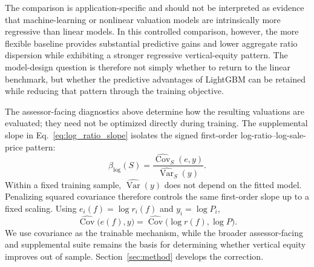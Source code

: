 \documentclass[10pt]{article}
\theoremstyle{definition}
\newcommand{\1}{\mathbf{1}}
\begin{document}

{The comparison is application-specific and should not be interpreted as evidence that machine-learning or nonlinear valuation models are intrinsically more regressive than linear models. In this controlled comparison, however, the more flexible baseline provides substantial predictive gains and lower aggregate ratio dispersion while exhibiting a stronger regressive vertical-equity pattern. The model-design question is therefore not simply whether to return to the linear benchmark, but whether the predictive advantages of LightGBM can be retained while reducing that pattern through the training objective.}


{The assessor-facing diagnostics above determine how the resulting valuations are evaluated; they need not be optimized directly during training. The supplemental slope in Eq.~\eqref{eq:log_ratio_slope} isolates the signed first-order log-ratio--log-sale-price pattern:
\[
\beta_{\log}(S)
=
\frac{\widehat{\operatorname{Cov}}_S(e,y)}
{\widehat{\operatorname{Var}}_S(y)}.
\]
Within a fixed training sample, $\widehat{\operatorname{Var}}(y)$ does not depend on the fitted model. Penalizing squared covariance therefore controls the same first-order slope up to a fixed scaling. Using $e_i(f)=\log r_i(f)$ and $y_i=\log P_i$,
\begin{equation}
\label{eq:training_covariance_bridge}
\widehat{\operatorname{Cov}}\bigl(e(f),y\bigr)
=
\widehat{\operatorname{Cov}}\bigl(\log r(f),\log P\bigr).
\end{equation}
We use covariance as the trainable mechanism, while the broader assessor-facing and supplemental suite remains the basis for determining whether vertical equity improves out of sample. Section~\ref{sec:method} develops the correction.}
\end{document}
